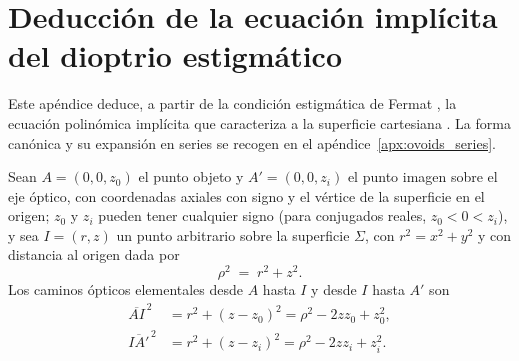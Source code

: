 \chapter{Deducción de la ecuación implícita del dioptrio estigmático}
\label{apx:ovoid_implicit_deduction}

Este apéndice deduce, a partir de la condición estigmática de Fermat
\cite{fermat1891oeuvres}, la ecuación polinómica implícita que caracteriza a
la superficie cartesiana \cite{dioptrique}. La forma canónica y su expansión
en series se recogen en el apéndice~\ref{apx:ovoids_series}.

\medskip

Sean $A=(0,0,z_0)$ el punto objeto y $A'=(0,0,z_i)$ el punto imagen sobre el
eje óptico, con coordenadas axiales con signo y el vértice de la superficie
en el origen; $z_0$ y $z_i$ pueden tener cualquier signo (para conjugados reales, $z_0<0<z_i$), y sea
$I=(r,z)$ un punto arbitrario sobre la superficie $\Sigma$, con $r^2=x^2+y^2$
y con distancia al origen dada por
\begin{equation}
\rho^2\;=\;r^2+z^2.
\label{eq:rho_definition_ovoid}
\end{equation}
Los caminos ópticos elementales desde $A$ hasta $I$ y desde $I$ hasta $A'$
son
\begin{align}
\overline{AI}^{\,2}
&= r^2+(z-z_0)^2
= \rho^2-2zz_0+z_0^2,
\label{eq:AI_squared_ovoid}
\\[4pt]
\overline{IA'}^{\,2}
&= r^2+(z-z_i)^2
= \rho^2-2zz_i+z_i^2.
\label{eq:IAp_squared_ovoid}
\end{align}

